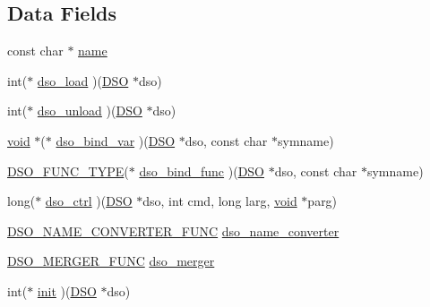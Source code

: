 \subsection*{Data Fields}
\begin{DoxyCompactItemize}
\item 
const char $\ast$ \hyperlink{structdso__meth__st_afcd1706c9144e6d6eee6127661ae3be2}{name}
\item 
int($\ast$ \hyperlink{structdso__meth__st_aa2924ebbd5eb5db60aa9a0bb113a7ae0}{dso\+\_\+load} )(\hyperlink{crypto_2dso_2dso_8h_a4ef2aefd03a4e43c3dd81a159fd27bca}{D\+SO} $\ast$dso)
\item 
int($\ast$ \hyperlink{structdso__meth__st_a103e03b8763dabecf427674af876b894}{dso\+\_\+unload} )(\hyperlink{crypto_2dso_2dso_8h_a4ef2aefd03a4e43c3dd81a159fd27bca}{D\+SO} $\ast$dso)
\item 
\hyperlink{hw__4758__cca_8h_afad4d591c7931ff6dc5bf69c76c96aa0}{void} $\ast$($\ast$ \hyperlink{structdso__meth__st_a147a776efa0a8cdfcccd56cc31f26066}{dso\+\_\+bind\+\_\+var} )(\hyperlink{crypto_2dso_2dso_8h_a4ef2aefd03a4e43c3dd81a159fd27bca}{D\+SO} $\ast$dso, const char $\ast$symname)
\item 
\hyperlink{include_2openssl_2dso_8h_aa8b57c987ab18733dbf4356cc705f0c7}{D\+S\+O\+\_\+\+F\+U\+N\+C\+\_\+\+T\+Y\+PE}($\ast$ \hyperlink{structdso__meth__st_af9fdcd8f7c937e657733860bfcdbfe32}{dso\+\_\+bind\+\_\+func} )(\hyperlink{crypto_2dso_2dso_8h_a4ef2aefd03a4e43c3dd81a159fd27bca}{D\+SO} $\ast$dso, const char $\ast$symname)
\item 
long($\ast$ \hyperlink{structdso__meth__st_a36f7607306424da4b5e07ae1a44bb49a}{dso\+\_\+ctrl} )(\hyperlink{crypto_2dso_2dso_8h_a4ef2aefd03a4e43c3dd81a159fd27bca}{D\+SO} $\ast$dso, int cmd, long larg, \hyperlink{hw__4758__cca_8h_afad4d591c7931ff6dc5bf69c76c96aa0}{void} $\ast$parg)
\item 
\hyperlink{include_2openssl_2dso_8h_a2053feef6f1d37b3fc3f96f6afb1eabf}{D\+S\+O\+\_\+\+N\+A\+M\+E\+\_\+\+C\+O\+N\+V\+E\+R\+T\+E\+R\+\_\+\+F\+U\+NC} \hyperlink{structdso__meth__st_a8ec168f1df62d7c10f193f2736bc1921}{dso\+\_\+name\+\_\+converter}
\item 
\hyperlink{include_2openssl_2dso_8h_aeb778a1546fa4335ba36dabe92103211}{D\+S\+O\+\_\+\+M\+E\+R\+G\+E\+R\+\_\+\+F\+U\+NC} \hyperlink{structdso__meth__st_aab7aa77e5c3fe1f02d6f89f24df0720b}{dso\+\_\+merger}
\item 
int($\ast$ \hyperlink{structdso__meth__st_a1d0ccf624078ee2ba092a714e209378c}{init} )(\hyperlink{crypto_2dso_2dso_8h_a4ef2aefd03a4e43c3dd81a159fd27bca}{D\+SO} $\ast$dso)

\end{DoxyCompactItemize}
